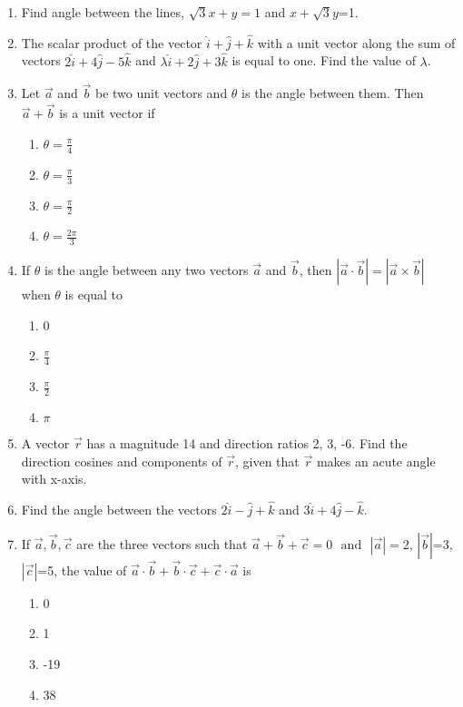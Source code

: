 \begin{enumerate}[label=\thesubsection.\arabic*,ref=\thesubsection.\theenumi]
\label{chapters/11/10/1/11}
\\
\solution 

\item    Find angle between the lines, $\sqrt{3}x+y=1$ and $x+\sqrt{3}y$=1.
\label{chapters/11/10/3/9}
   \solution 

\item The scalar product of the vector $\hat{i}+\hat{j}+\hat{k}$ with a unit vector along the sum of vectors $2\hat{i}+4\hat{j}-5\hat{k}$ and $\lambda\hat{i}+2\hat{j}+3\hat{k}$ is equal to one. Find the value of $\lambda$.
\item Let $\vec{a}$ and $\vec{b}$ be two unit vectors and $\theta$ is the angle between them. Then $\vec{a}+\vec{b}$ is a unit vector if
\begin{enumerate}
\item $\theta=\frac{\pi}{4}$
\item $\theta=\frac{\pi}{3}$
\item $\theta=\frac{\pi}{2}$
\item $\theta=\frac{2\pi}{3}$
\end{enumerate}
\item If $\theta$ is the angle between any two vectors $\vec{a}$ and $\vec{b}$, then $|\vec{a} \cdot \vec{b}|=|\vec{a}\times\vec{b}|$ when $\theta$ is equal to
\begin{enumerate}
\item 0
\item $\frac{\pi}{4}$
\item $\frac{\pi}{2}$
\item $\pi$
\end{enumerate}
\item A vector $\vec{r}$ has a magnitude 14 and direction ratios 2, 3, -6. Find the direction cosines and components of $\vec{r}$, given that $\vec{r}$ makes an acute angle with x-axis.
\item Find the angle between the vectors $2\hat{i}-\hat{j}+\hat{k}$ and $3\hat{i}+4\hat{j}-\hat{k}$.
\item If $\vec{a},\vec{b},\vec{c}$ are the three vectors such that $\vec{a}+\vec{b}+\vec{c}=0$ $\text{ and }$ $|\vec{a}|=2$, $|\vec{b}|$=3, $|\vec{c}|$=5, the value of $\vec{a} \cdot \vec{b}+\vec{b} \cdot \vec{c}+\vec{c} \cdot \vec{a}$ is
	\begin{enumerate}
\item 0
\item 1	
\item -19
\item 38
\end{enumerate}

\end{enumerate}

